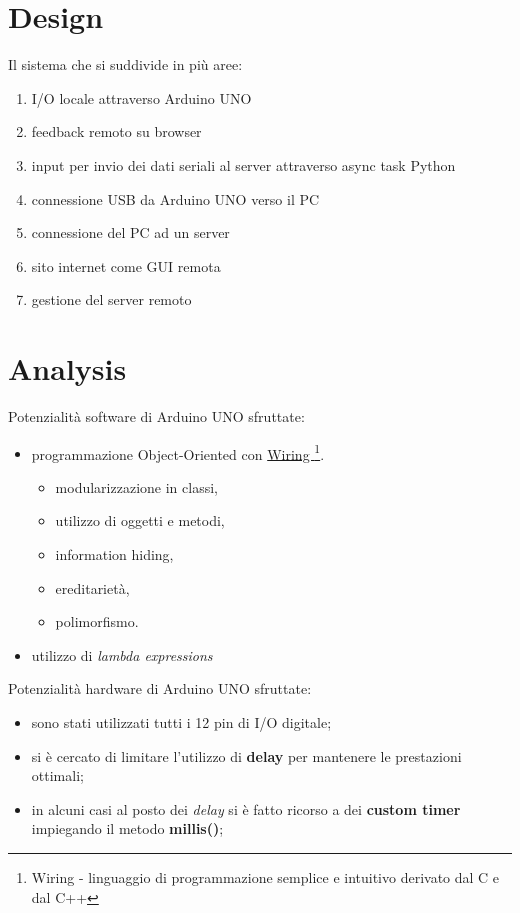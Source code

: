 \section{Design}
Il sistema che si suddivide in più aree:
\begin{enumerate}
	\item I/O locale attraverso Arduino UNO
	\item feedback remoto su browser
	\item input per invio dei dati seriali al server attraverso async task Python
	\item connessione USB da Arduino UNO verso il PC
	\item connessione del PC ad un server
	\item sito internet come GUI remota
	\item gestione del server remoto
\end{enumerate}

\section{Analysis}
Potenzialità software di Arduino UNO sfruttate:
\begin{itemize}
	\item programmazione Object-Oriented con \href{https://it.wikipedia.org/wiki/Wiring}{Wiring \footnote{Wiring - linguaggio di programmazione semplice e intuitivo derivato dal C e dal C++}}.
	\begin{itemize}
		\item modularizzazione in classi,
		\item utilizzo di oggetti e metodi,
		\item information hiding, 
		\item ereditarietà, 
		\item polimorfismo.
	\end{itemize}

	\item utilizzo di \textit{lambda expressions}
\end{itemize}
Potenzialità hardware di Arduino UNO sfruttate:
\begin{itemize}
	\item sono stati utilizzati tutti i 12 pin di I/O digitale;
	\item si è cercato di limitare l'utilizzo di \textbf{delay} per mantenere le prestazioni ottimali;
	\item in alcuni casi al posto dei \textit{delay} si è fatto ricorso a dei \textbf{custom timer} impiegando il metodo \textbf{millis()};
\end{itemize}
